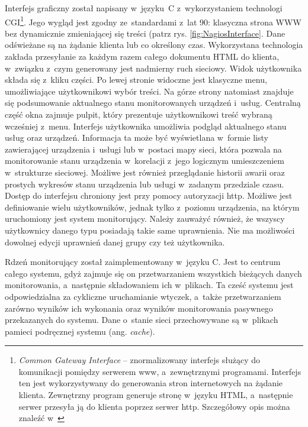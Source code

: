 Interfejs graficzny został napisany w~języku~C z~wykorzystaniem
technologi CGI\footnote{{\em Common Gateway Interface} --
  znormalizowany interfejs służący do komunikacji pomiędzy serwerem
  www, a~zewnętrznymi programami. Interfejs ten jest wykorzystywany do
  generowania stron internetowych na żądanie klienta. Zewnętrzny
  program generuje stronę w~języku HTML, a~następnie serwer przesyła
  ją do klienta poprzez serwer http. Szczegółowy opis można znaleźć
  w~\cite{www:CGI}}. Jego wygląd jest zgodny ze~standardami z~lat 90:
klasyczna strona WWW bez dynamicznie zmieniającej się treści (patrz
rys. \ref{fig:NagiosInterface}. Dane odświeżane są na żądanie klienta
lub co określony czas. Wykorzystana technologia zakłada przesyłanie za
każdym razem całego dokumentu HTML do klienta, w~związku z~czym
generowany jest nadmierny ruch sieciowy. Widok użytkownika składa się
z~kliku części. Po lewej stronie widoczne jest klasyczne menu,
umożliwiające użytkownikowi wybór treści. Na górze strony natomiast
znajduje się podsumowanie aktualnego stanu monitorowanych urządzeń
i~usług. Centralną część okna zajmuje pulpit, który prezentuje
użytkownikowi treść wybraną wcześniej z~menu. Interfejs użytkownika
umożliwia podgląd aktualnego stanu usług oraz urządzeń. Informacja ta
może być wyświetlana w~formie listy zawierającej urządzenia i~usługi
lub w~postaci mapy sieci, która pozwala na monitorowanie stanu
urządzenia w~korelacji z~jego logicznym umieszczeniem w~strukturze
sieciowej. Możliwe jest również przeglądanie historii awarii oraz
prostych wykresów stanu urządzenia lub usługi w~zadanym przedziale
czasu. Dostęp do interfejsu chroniony jest przy pomocy autoryzacji
http. Możliwe jest definiowanie wielu użytkowników, jednak tylko
z~poziomu urządzenia, na którym uruchomiony jest system
monitorujący. Należy zauważyć również, że wszyscy użytkownicy danego
typu posiadają takie same uprawnienia. Nie ma możliwości dowolnej
edycji uprawnień danej grupy czy też użytkownika.

Rdzeń monitorujący został zaimplementowany w~języku C. Jest to centrum
całego systemu, gdyż zajmuje się on przetwarzaniem wszystkich
bieżących danych monitorowania, a~następnie składowaniem ich
w~plikach. Ta cześć systemu jest odpowiedzialna za cykliczne
uruchamianie wtyczek, a~także przetwarzaniem zarówno wyników ich
wykonania oraz wyników monitorowania pasywnego przekazanych do
systemu. Dane o~stanie sieci przechowywane są w~plikach pamieci
podręcznej systemu (ang. {\em cache}).

